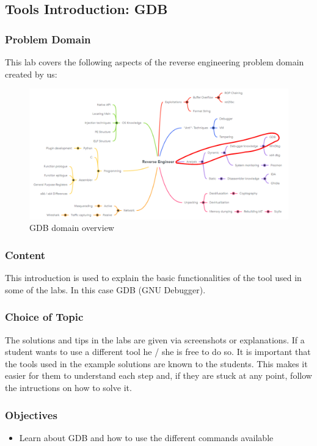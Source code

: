 \subsection{Tools Introduction: GDB}
\subsubsection*{Problem Domain}
This lab covers the following aspects of the reverse engineering problem domain created by us:
\vspace{-2ex}
\begin{figure}[H]
    \includegraphics[width=\textwidth]{resources/GDBIntro-overview-light.png}
    \caption{GDB domain overview}
    \label{fig:gdb-overview}
\end{figure}
\subsubsection*{Content}
This introduction is used to explain the basic functionalities of the tool used in some of the labs. In this case GDB (GNU Debugger).
\subsubsection*{Choice of Topic}
The solutions and tips in the labs are given via screenshots or explanations. If a student wants to use a different tool he / she is free to do so. It is important that the tools used in the example solutions are known to the students. This makes it easier for them to understand each step and, if they are stuck at any point, follow the intructions on how to solve it. 
\subsubsection*{Objectives}
\begin{itemize}
    \item Learn about GDB and how to use the different commands available
\end{itemize}
